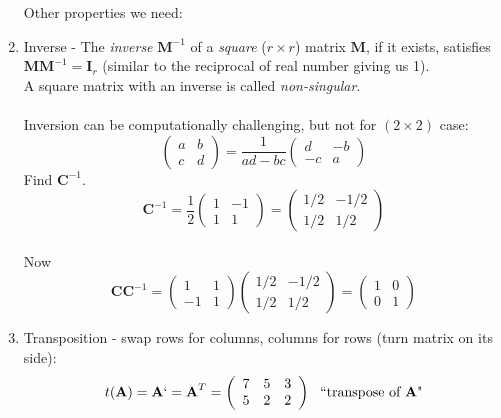 \begin{enumerate}
Other properties we need:
\item Inverse -  The {\em inverse} $\textbf{M}^{-1}$ of a {\em square} ($r \times r$) matrix $\textbf{M}$,
if it exists, satisfies $\textbf{MM}^{-1}=\textbf{I}_r$ (similar to the reciprocal of real number giving us 1).\\
 A square matrix with an inverse is called {\em non-singular}.\\~\\
Inversion can be computationally challenging, but not for
$(2 \times 2)$ case:
$$ \left(\begin{array}{cc} a & b \\ c & d \end{array}\right) = 
\frac{1}{ad-bc}
\left(\begin{array}{cc} d & -b \\ -c & a \end{array}\right) $$
Find $\textbf{C}^{-1}$.
$$\textbf{C}^{-1} = \frac{1}{2}\left(\begin{array}{cc} 1 & -1 \\ 1 & 1\end{array}\right)=\left(\begin{array}{cc} 1/2 & -1/2 \\ 1/2 & 1/2\end{array}\right)$$~\\
Now 
$$\textbf{C}\textbf{C}^{-1}=\left(\begin{array}{cc} 1 & 1 \\ -1 & 1 \end{array}\right)\left(\begin{array}{cc} 1/2 & -1/2 \\ 1/2 & 1/2\end{array}\right)=\left(\begin{array}{cc} 1 & 0 \\ 0 & 1\end{array}\right)$$

\newpage

\item Transposition - swap rows for columns, columns for rows (turn matrix on its side):
\[
t(\textbf{A}) = \textbf{A}` = \textbf{A}^{T} = 
\left(\begin{array}{ccc} 7 & 5 & 3 \\ 5 & 2 & 2 \end{array}\right) \ \ \mbox{``transpose of $\textbf{A}$"}
\]
\end{enumerate}
~\\

